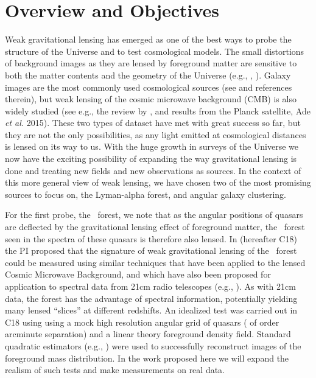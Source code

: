 \section{Overview and Objectives}
Weak gravitational lensing 
has emerged as one of the best ways to probe the
structure of the Universe and to test cosmological models. The 
small distortions
of background images as they are lensed by foreground matter
are sensitive to both the matter contents and the geometry of the Universe
(e.g., \cite{blandford92}, \cite{hoekstra2008}).
Galaxy images are the most commonly used cosmological 
sources (see \cite{Kilbinger2015} and references therein),
but weak lensing of the cosmic microwave background (CMB) 
is also widely studied (see e.g., the review by \cite{lewis2006}
, and results from the Planck satellite, Ade {\it et
 al.} 2015). These two types of dataset have met with great success
so far, but they are not the only possibilities, as any light emitted
at cosmological distances is lensed on its way to us. With the huge
growth in surveys of the Universe we now have the exciting possibility
of expanding the way gravitational lensing is done and treating new
fields and new observations as sources. In the context of this more general
view of weak lensing, we have chosen two of the most
promising sources to focus on, the Lyman-alpha forest, and 
angular galaxy clustering. 

For the first probe, the \lya\ forest, we note that as the angular 
positions of quasars are deflected by the 
gravitational lensing effect of foreground matter, the \lya\ forest 
seen in the spectra of these quasars is 
therefore also lensed.
In \cite{croft17} (hereafter C18)
 the PI proposed that the 
signature of weak gravitational lensing of the \lya\ forest
could be measured using similar techniques that have been applied to
the lensed Cosmic Microwave Background, and which have also been proposed for
application to  spectral data from 21cm radio telescopes 
(e.g., \cite{zahn2006}). 
As with 21cm data, the forest has the advantage of spectral information,
potentially yielding many lensed ``slices'' at different redshifts.
An idealized test was carried out in C18 using
using a mock  high resolution angular grid of quasars (
of order arcminute separation) and a linear theory foreground density
field. Standard quadratic estimators (e.g., \cite{okamoto})  
were used to successfully  reconstruct images of the foreground mass 
distribution. In the work proposed here we will expand the realism
of such tests and make measurements on real data.
 
